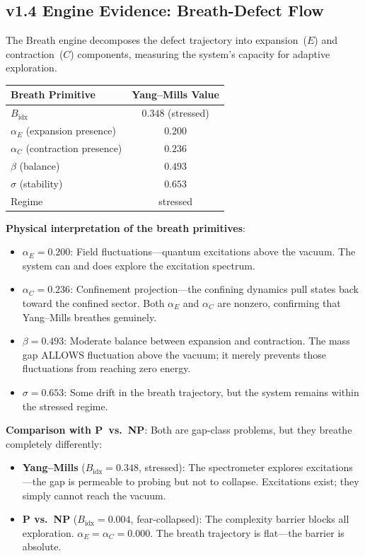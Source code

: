 \documentclass[11pt]{article}
\begin{document}
\subsection{v1.4 Engine Evidence: Breath-Defect Flow}

The Breath engine decomposes the defect trajectory into expansion~($E$)
and contraction~($C$) components, measuring the system's capacity for
adaptive exploration.

\begin{center}
\begin{tabular}{|l|c|}
\hline
\textbf{Breath Primitive} & \textbf{Yang--Mills Value} \\
\hline
$B_{\mathrm{idx}}$ & $0.348$ (stressed) \\
$\alpha_E$ (expansion presence) & $0.200$ \\
$\alpha_C$ (contraction presence) & $0.236$ \\
$\beta$ (balance) & $0.493$ \\
$\sigma$ (stability) & $0.653$ \\
Regime & stressed \\
\hline
\end{tabular}
\end{center}

\noindent
\textbf{Physical interpretation of the breath primitives}:
\begin{itemize}
  \item $\alpha_E = 0.200$: Field fluctuations---quantum excitations
    above the vacuum.  The system can and does explore the excitation
    spectrum.
  \item $\alpha_C = 0.236$: Confinement projection---the confining
    dynamics pull states back toward the confined sector.  Both $\alpha_E$
    and $\alpha_C$ are nonzero, confirming that Yang--Mills breathes
    genuinely.
  \item $\beta = 0.493$: Moderate balance between expansion and
    contraction.  The mass gap ALLOWS fluctuation above the vacuum; it
    merely prevents those fluctuations from reaching zero energy.
  \item $\sigma = 0.653$: Some drift in the breath trajectory, but the
    system remains within the stressed regime.
\end{itemize}

\noindent
\textbf{Comparison with P~vs.~NP}: Both are gap-class problems, but
they breathe completely differently:
\begin{itemize}
  \item \textbf{Yang--Mills} ($B_{\mathrm{idx}} = 0.348$, stressed):
    The spectrometer explores excitations---the gap is permeable to
    probing but not to collapse.  Excitations exist; they simply cannot
    reach the vacuum.
  \item \textbf{P vs.\ NP} ($B_{\mathrm{idx}} = 0.004$,
    fear-collapsed): The complexity barrier blocks all exploration.
    $\alpha_E = \alpha_C = 0.000$.  The breath trajectory is flat---the
    barrier is absolute.
\end{itemize}
\end{document}
